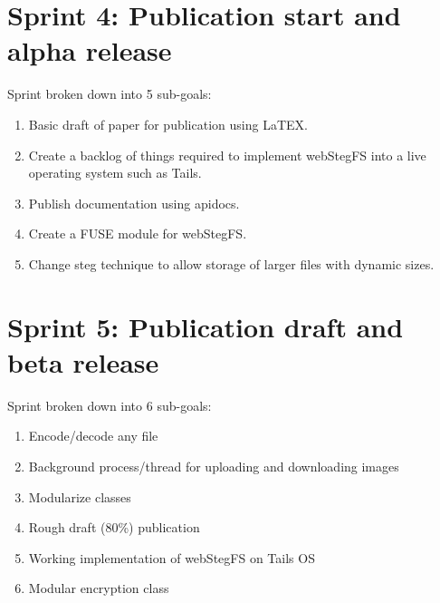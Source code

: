 \documentclass[letterpaper,12pt,openany,oneside]{sphinxmanual}
\begin{document}
\section{Sprint 4: Publication start and alpha release}
\label{index:sprint-4-publication-start-and-alpha-release}
Sprint broken down into 5 sub-goals:
\begin{enumerate}
\item {} 
Basic draft of paper for publication using LaTEX.

\item {} 
Create a backlog of things required to implement webStegFS into a live operating system such as Tails.

\item {} 
Publish documentation using apidocs.

\item {} 
Create a FUSE module for webStegFS.

\item {} 
Change steg technique to allow storage of larger files with dynamic sizes.

\end{enumerate}


\section{Sprint 5: Publication draft and beta release}
\label{index:sprint-5-publication-draft-and-beta-release}
Sprint broken down into 6 sub-goals:
\begin{enumerate}
\item {} 
Encode/decode any file

\item {} 
Background process/thread for uploading and downloading images

\item {} 
Modularize classes

\item {} 
Rough draft (80\%) publication

\item {} 
Working implementation of webStegFS on Tails OS

\item {} 
Modular encryption class

\end{enumerate}
\end{document}
